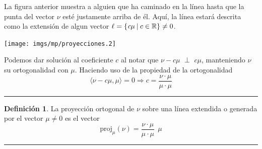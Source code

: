 \documentclass[11pt]{article}
\theoremstyle{definition}
\newtheorem{definicion}[defn]{Definición}
\begin{document}
La figura anterior muestra a alguien que ha caminado en la línea hasta que la punta del vector $\nu$ esté justamente arriba de él. Aquí, la línea estará descrita como la extensión de algun vector $\ell = \{\emph{c}\mu \: \lvert \: c \in \mathbb{R}\} \neq 0$.

\begin{center}
\texttt{[image: imgs/mp/proyecciones.2]}
\end{center}

Podemos dar solución al coeficiente $c$ al notar que $\nu - c\mu$ $\perp$ $c\mu$, manteniendo $\nu$ su ortogonalidad con $\mu$. Haciendo uso de la propiedad de la ortogonalidad \[\langle\nu-c\mu,\mu\rangle = 0 \Rightarrow c = \frac{\nu\cdot\mu}{\mu\cdot\mu}\]

\hrule
\begin{definicion}
	La proyección ortogonal de $\nu$ sobre una línea extendida o generada por el vector $\mu \neq 0$ es el vector 
	\[ \textrm{proj}_{\mu}(\nu) = \frac{\nu\cdot\mu}{\mu\cdot\mu}\:\:\mu\]
\end{definicion}
\hrule
\end{document}

